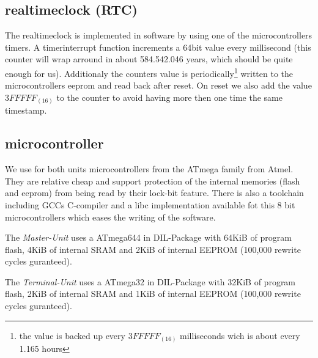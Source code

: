 
\subsection{realtimeclock (RTC)}
The realtimeclock is implemented in software by using one of the microcontrollers timers. A timerinterrupt function increments a 64bit value every millisecond (this counter will wrap arround in about 584.542.046 years, which should be quite enough for us). Additionaly the counters value is periodically\footnote{the value is backed up every $3FFFFF_{(16)}$ milliseconds wich is about every 1.165 hours} written to the microcontrollers eeprom and read back after reset. On reset we also add the value $3FFFFF_{(16)}$ to the counter to avoid having more then one time the same timestamp.


\subsection{microcontroller}
We use for both units microcontrollers from the ATmega family from Atmel\cite{Atmel}. They are relative cheap and support protection of the internal memories (flash and eeprom) from being read by their lock-bit feature. There is also a toolchain including GCCs\cite{GCC} C-compiler and a libc implementation\cite{AVR-Libc} available fot this 8 bit microcontrollers which eases the writing of the software.

The \textit{Master-Unit} uses a ATmega644\cite{ATmega644} in DIL-Package with 64KiB of program flash, 4KiB of internal SRAM and 2KiB of internal EEPROM (100,000 rewrite cycles guranteed).

The \textit{Terminal-Unit} uses a ATmega32\cite{ATmega32} in DIL-Package with 32KiB of program flash, 2KiB of internal SRAM and 1KiB of internal EEPROM (100,000 rewrite cycles guranteed).
 



